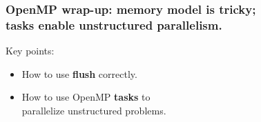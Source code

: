 \begin{frame}
  \frametitle{OpenMP wrap-up: memory model is tricky; \\ tasks enable unstructured parallelism.}

  \begin{changemargin}{1cm}
\Large
    Key points:\\
  \begin{itemize}
    \item How to use {\bf flush} correctly.
    \item How to use OpenMP {\bf tasks} to\\ \hspace*{2em} parallelize unstructured problems.
  \end{itemize}
  \end{changemargin}
  
\end{frame}




